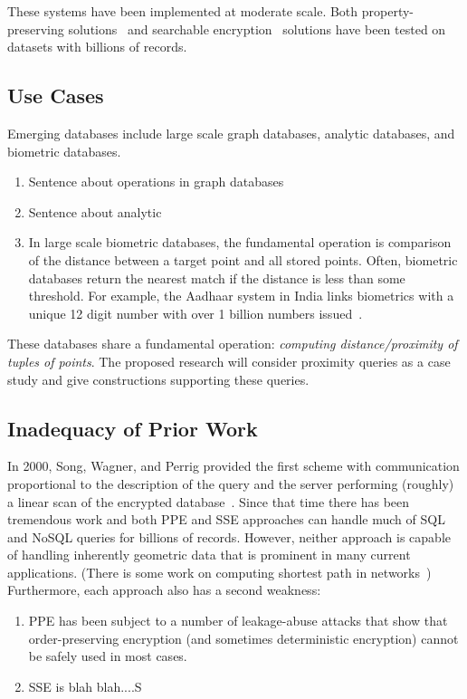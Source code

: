 These systems have been implemented at moderate scale.  Both property-preserving solutions~\cite{EPRINT:PodBoePop16,CACM:PRZB12} and searchable encryption~\cite{SP:PKVKMC14,SP:FVKKKM15,C:CJJKRS13,CCS:JJKRS13,NDSS:CJJJKR14,ESORICS:FJKNRS15,RSA:IKLO16} solutions have been tested on datasets with billions of records.

%


\subsection{Use Cases}
Emerging databases include large scale graph databases, analytic databases, and
biometric databases. 
\begin{enumerate}
\item Sentence about operations in graph databases
\item Sentence about analytic
\item In large scale biometric databases, the fundamental operation is comparison of the distance between a target point and all stored points. Often, biometric databases return the nearest match if the distance is less than some threshold.  For example, the Aadhaar system in India links biometrics with a unique 12 digit number with over 1 billion numbers issued~\cite{daugman2014600}.
\end{enumerate}

These databases share a fundamental operation: {\em
computing distance/proximity of tuples of points}. The proposed research will
consider proximity queries as a case study and give constructions supporting
these queries. 


\subsection{Inadequacy of Prior Work}

In 2000, Song, Wagner, and Perrig provided the first scheme with communication proportional to the description of the query and the server performing (roughly) a linear scan of the encrypted database~\cite{SP:SonWagPer00}.  Since that time there has been tremendous work and both PPE and SSE approaches can handle much of SQL and NoSQL queries for billions of records.  However, neither approach is capable of handling inherently geometric data that is prominent in many current applications. (There is some work on computing shortest path in networks~\cite{CCS:MKNK15})  Furthermore, each approach also has a second weakness:
\begin{enumerate}
\item PPE has been subject to a number of leakage-abuse attacks that show that order-preserving encryption (and sometimes deterministic encryption) cannot be safely used in most cases.
\item SSE is blah blah....S
\end{enumerate}




